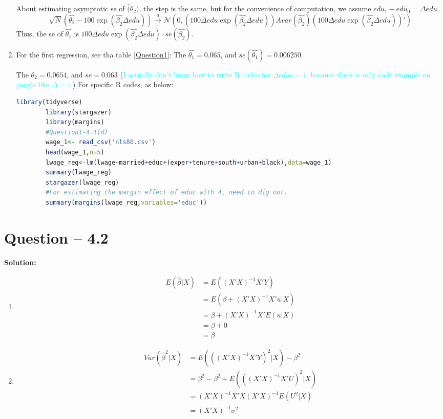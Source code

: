 \documentclass[11pt]{article} %
\begin{document}
\begin{enumerate}
      About estimating asymptotic se of $\hat(\theta_2)$, the step is the same, but for the convenience of computation, we assume $edu_1-edu_0=\Delta edu$.
      \begin{equation*}
          \sqrt{N}(\hat{\theta_2}-100\exp(\hat{\beta_2}\Delta edu))\xrightarrow{a}\mathcal{N}(0,(100\Delta edu \exp(\hat{\beta_2}\Delta edu))Avar(\hat{\beta_2})(100\Delta edu \exp(\hat{\beta_2}\Delta edu))')
      \end{equation*}
      Thus, the se of $\hat{\theta_1}$ is $100\Delta edu \exp(\hat{\beta_2}\Delta edu)\cdot se(\hat{\beta_2})$.
    \item For the first regression, see tha table \ref{Question1}: The $\hat{\theta_1}=0.065$, and $se(\hat{\theta_1})=0.006250$.
      
      The $\theta_2=0.0654$, and $se=0.063$ (\textcolor{Cyan}{I actually don't know how to write R codes for $\Delta educ=4$, because there is only code example on google like $\Delta=1$.})
      For specific R codes, as below:
      \begin{lstlisting}[language=R]
        library(tidyverse)
        library(stargazer)
        library(margins)
        #Question1-4.1(d)
        wage_1<- read_csv('nls80.csv')
        head(wage_1,n=5)
        lwage_reg<-lm(lwage~married+educ+(exper+tenure+south+urban+black),data=wage_1)
        summary(lwage_reg)
        stargazer(lwage_reg)
        #For estimating the margin effect of educ with 4, need to dig out.
        summary(margins(lwage_reg,variables='educ'))
      \end{lstlisting}
\end{enumerate}


\section{Question -- 4.2}
\textbf{Solution:}
\begin{enumerate}
    \item  \begin{align*}
        E(\hat{\beta}|X)&=E((X'X)^{-1}X'Y)\\
                        &=E(\beta+(X'X)^{-1}X'u|X)\\
                        &=\beta+(X'X)^{-1}X'E(u|X)\\
                        &=\beta+0\\
                        &=\beta
    \end{align*}
    \item \begin{align*}
        Var(\hat{\beta}^2|X)&=E(((X'X)^{-1}X'Y)^2|X)-\beta^2\\
                            &=\beta^2-\beta^2+E(((X'X)^{-1}X'U)^2|X)\\
                            &=(X'X)^{-1}X'X(X'X)^{-1}E(U^2|X)\\
                            &=(X'X)^{-1}\sigma^2
    \end{align*}
\end{enumerate}
\end{document}
